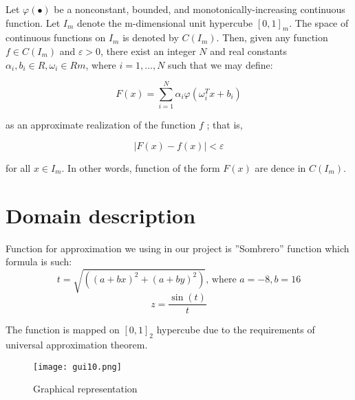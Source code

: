 \documentclass[a4paper,12pt]{article}
\begin{document}
Let $\varphi(\bullet) $ be a nonconstant, bounded, and monotonically-increasing continuous function. Let $I_m$ denote the m-dimensional unit hypercube $ [0,1]_m. $ The space of continuous functions on $ I_m $ is denoted by $C(I_m)$. Then, given any function $ f \in C(I_m) $ and $ \varepsilon > 0 $, there exist an integer $ N $ and real constants $ \alpha_i, b_i \in R, \omega_i \in Rm $, where $ i = 1, \hdots, N $ such that we may define:

\begin{equation}
 F(x) = \sum\limits_{i=1}^N\alpha_i\varphi(\omega_i^Tx+b_i) 
\end{equation}

as an approximate realization of the function $ f $ ; that is,

\begin{equation}
 |F(x)-f(x)|<\varepsilon
\end{equation}

for all $ x \in I_m$. In other words, function of the form $ F(x) $ are dence in $ C(I_m) $.   

\section{Domain description}
Function for approximation we using in our project is ''Sombrero'' function which formula is such:
\begin{equation}
 t = \sqrt{((a+bx)^2+(a+by)^2)} \text{, where } a = -8, b = 16
 \end{equation}
 \begin{equation}
 z = \frac
 {\sin(t)}
 {t}
\end{equation}

The function is mapped on $[0,1]_2$ hypercube due to the requirements of universal approximation theorem.

\begin{figure}[h]
 \centering
 \texttt{[image: gui10.png]}
 \caption{Graphical representation}
\end{figure}
\end{document}
